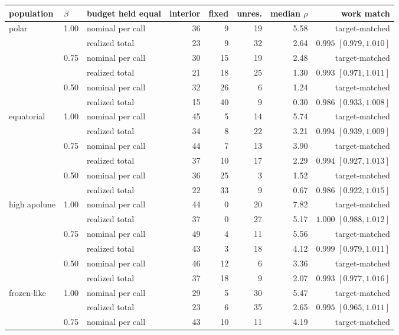 \begin{tabular}{@{}l l l r r r r r@{}}
\toprule
population & $\beta$ & budget held equal & interior & fixed & unres. & median $\rho$ & work match \\
\midrule
polar & 1.00 & nominal per call & 36 & 9 & 19 & 5.58 & target-matched \\
 & & realized total & 23 & 9 & 32 & 2.64 & $0.995$ $[0.979,1.010]$ \\
 & 0.75 & nominal per call & 30 & 15 & 19 & 2.48 & target-matched \\
 & & realized total & 21 & 18 & 25 & 1.30 & $0.993$ $[0.971,1.011]$ \\
 & 0.50 & nominal per call & 32 & 26 & 6 & 1.24 & target-matched \\
 & & realized total & 15 & 40 & 9 & 0.30 & $0.986$ $[0.933,1.008]$ \\
\addlinespace
equatorial & 1.00 & nominal per call & 45 & 5 & 14 & 5.74 & target-matched \\
 & & realized total & 34 & 8 & 22 & 3.21 & $0.994$ $[0.939,1.009]$ \\
 & 0.75 & nominal per call & 44 & 7 & 13 & 3.90 & target-matched \\
 & & realized total & 37 & 10 & 17 & 2.29 & $0.994$ $[0.927,1.013]$ \\
 & 0.50 & nominal per call & 36 & 25 & 3 & 1.52 & target-matched \\
 & & realized total & 22 & 33 & 9 & 0.67 & $0.986$ $[0.922,1.015]$ \\
\addlinespace
high apolune & 1.00 & nominal per call & 44 & 0 & 20 & 7.82 & target-matched \\
 & & realized total & 37 & 0 & 27 & 5.17 & $1.000$ $[0.988,1.012]$ \\
 & 0.75 & nominal per call & 49 & 4 & 11 & 5.56 & target-matched \\
 & & realized total & 43 & 3 & 18 & 4.12 & $0.999$ $[0.979,1.011]$ \\
 & 0.50 & nominal per call & 46 & 12 & 6 & 3.36 & target-matched \\
 & & realized total & 37 & 18 & 9 & 2.07 & $0.993$ $[0.977,1.016]$ \\
\addlinespace
frozen-like & 1.00 & nominal per call & 29 & 5 & 30 & 5.47 & target-matched \\
 & & realized total & 23 & 6 & 35 & 2.65 & $0.995$ $[0.965,1.011]$ \\
 & 0.75 & nominal per call & 43 & 10 & 11 & 4.19 & target-matched \\

\end{tabular}
